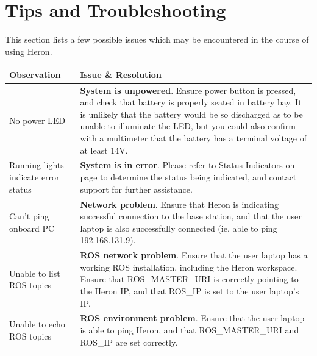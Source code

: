 \documentclass[]{clearpath-latex/clearpath-manual}
\begin{document}
\newpage

\section{Tips and Troubleshooting}
This section lists a few possible issues which may be encountered in the course of using Heron.

\bgroup
\def\arraystretch{1.5}%
\begin{table}[h]
\centering
\label{troublshooting}
\begin{tabular}{p{} p{}}

\rowcolor{lightgrey}
{\bf Observation}                    & {\bf Issue \& Resolution}                                                                                                                                                                                                                                                                                          \\ \hline
No power LED                         & \textbf{System is unpowered}. Ensure power button is pressed, and check that battery is properly seated in battery bay. It is unlikely that the battery would be so discharged as to be unable to illuminate the LED, but you could also confirm with a multimeter that the battery has a terminal voltage of at least 14V. \\ \hline
Running lights indicate error status & \textbf{System is in error}. Please refer to Status Indicators on page \pageref{statusindicators} to determine the status being indicated, and contact support for further assistance.                                                                                                                                                               \\ \hline
Can’t ping onboard PC                & \textbf{Network problem}. Ensure that Heron is indicating successful connection to the base station, and that the user laptop is also successfully connected (ie, able to ping 192.168.131.9).                                                                                                                           \\ \hline
Unable to list ROS topics            & \textbf{ROS network problem}. Ensure that the user laptop has a working ROS installation, including the Heron workspace. Ensure that ROS\_MASTER\_URI is correctly pointing to the Heron IP, and that ROS\_IP is set to the user laptop’s IP.                                                                     \\ \hline
Unable to echo ROS topics            & \textbf{ROS environment problem}. Ensure that the user laptop is able to ping Heron, and that ROS\_MASTER\_URI and ROS\_IP are set correctly.                                                                                                                                                                          \\ \hline
\end{tabular}
\end{table}
\egroup
\end{document}
